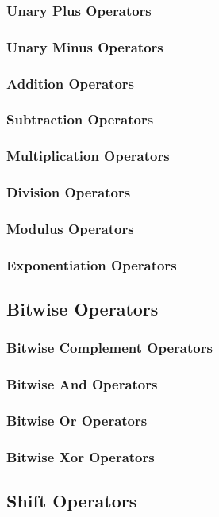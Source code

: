 \documentclass[10pt,twoside,titlepage]{article}
\begin{document}
\subsubsection{Unary Plus Operators}
\subsubsection{Unary Minus Operators}
\subsubsection{Addition Operators}
\subsubsection{Subtraction Operators}
\subsubsection{Multiplication Operators}
\subsubsection{Division Operators}
\subsubsection{Modulus Operators}
\subsubsection{Exponentiation Operators}
\subsection{Bitwise Operators}
\subsubsection{Bitwise Complement Operators}
\subsubsection{Bitwise And Operators}
\subsubsection{Bitwise Or Operators}
\subsubsection{Bitwise Xor Operators}
\subsection{Shift Operators}
\end{document}
